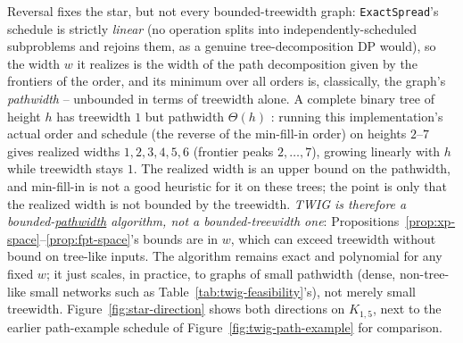 \documentclass[preprint,11pt]{elsarticle}
\theoremstyle{definition}
\theoremstyle{remark}
\begin{document}
Reversal fixes the star, but not every bounded-treewidth graph:
\texttt{ExactSpread}'s schedule is strictly \emph{linear} (no operation
splits into independently-scheduled subproblems and rejoins them, as a
genuine tree-decomposition DP would), so the width $w$ it realizes is
the width of the path decomposition given by the frontiers of the order, and its minimum
over all orders is, classically, the graph's \emph{pathwidth}
\citep{kinnersley1992} -- unbounded in terms of treewidth alone. A
complete binary tree of height $h$ has treewidth $1$ but pathwidth
$\Theta(h)$ \citep{kinnersley1992}: running this implementation's actual
order and schedule (the reverse of the min-fill-in order) on heights
$2$--$7$ gives realized widths $1,2,3,4,5,6$ (frontier peaks $2,\dots,7$), growing linearly with $h$ while treewidth stays $1$. The realized width is an upper bound on the pathwidth, and min-fill-in is not a good heuristic for it on these trees; the point is only that the realized width is not bounded by the treewidth. \emph{TWIG is therefore a
bounded-\underline{pathwidth} algorithm, not a bounded-treewidth one}:
Propositions~\ref{prop:xp-space}--\ref{prop:fpt-space}'s bounds are in
$w$, which can exceed treewidth without bound on tree-like inputs. The
algorithm remains exact and polynomial for any fixed $w$; it just scales,
in practice, to graphs of small pathwidth (dense, non-tree-like small
networks such as Table~\ref{tab:twig-feasibility}'s), not merely small
treewidth.
Figure~\ref{fig:star-direction} shows both directions on $K_{1,5}$, next
to the earlier path-example schedule of Figure~\ref{fig:twig-path-example}
for comparison.
\end{document}
